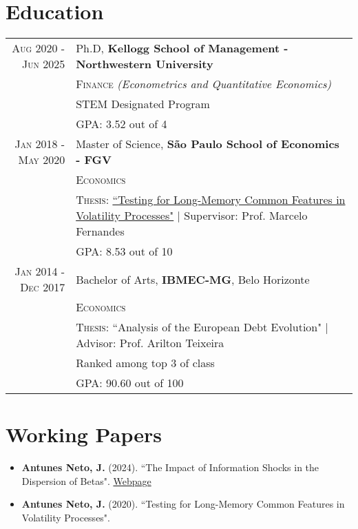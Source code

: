 \documentclass[a4paper,10pt]{article}
\begin{document}
\section{Education}
\begin{tabular}{r|p{8.75cm}}	
    \textsc{Aug} 2020 - \textsc{Jun} 2025 & Ph.D, \normalsize\textbf{Kellogg School of Management - Northwestern University} \\
    & \textsc{Finance} \textit{(Econometrics and Quantitative Economics)} \\
    & \normalsize \textsc{STEM} Designated Program \\
    & \normalsize \textsc{GPA}: 3.52 out of 4 \\
    \textsc{Jan} 2018 - \textsc{May} 2020 & Master of Science, \normalsize\textbf{São Paulo School of Economics - FGV} \\
    & \textsc{Economics} \\
    & \normalsize \textsc{Thesis}: \href{http://hdl.handle.net/10438/29188}{``Testing for Long-Memory Common Features in Volatility Processes"} | \small Supervisor: Prof. Marcelo Fernandes \\ 
    &\normalsize \textsc{GPA}: 8.53 out of 10
    \\
    \textsc{Jan} 2014 - \textsc{Dec} 2017& Bachelor of Arts, \normalsize\textbf{IBMEC-MG}, Belo Horizonte \\
    & \textsc{Economics} \\
    & \normalsize \textsc{Thesis}: ``Analysis of the European Debt Evolution" | \small Advisor: Prof. Arilton Teixeira \\
    & \normalsize{Ranked among top 3 of class} \\
    &\normalsize \textsc{GPA}: 90.60 out of 100
\end{tabular}


\section{Working Papers}
\begin{itemize}
    \item \textbf{Antunes Neto, J.} (2024). ``The Impact of Information Shocks in the Dispersion of Betas". \href{https://joseparreiras.github.io/projects/news-and-betas}{Webpage}
    \item \textbf{Antunes Neto, J.} (2020). ``Testing for Long-Memory Common Features in Volatility Processes".
\end{itemize}
\end{document}
